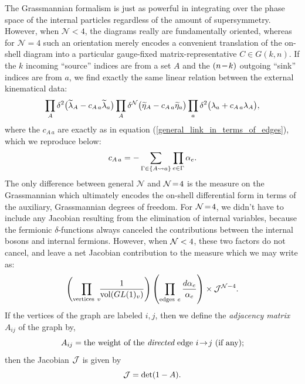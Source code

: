 \documentclass[12pt,hyperref,compress]{JHEP3}
\newcommand{\eq}[1]{\begin{equation}#1\end{equation}}
\newcommand{\mi}{{\rm\rule[2.4pt]{6pt}{0.65pt}}}
\begin{document}
The Grassmannian formalism is just as powerful in integrating over the phase space of the internal particles regardless of the amount of supersymmetry. However, when $\mathcal{N}<4$, the diagrams really are fundamentally oriented, whereas for $\mathcal{N}\!=\!4$ such an orientation merely encodes a convenient translation of the on-shell diagram into a particular gauge-fixed  matrix-representative $C\!\in\!G(k,n)$. If the $k$ incoming ``source'' indices are from a set  $A$ and the $(n\,\mi\,k)$ outgoing ``sink'' indices are from $a$, we find exactly the same linear relation between the external kinematical data:
\vspace{-.2cm}\eq{\prod_A\delta^2\big(\widetilde\lambda_A - c_{A\,a} \widetilde\lambda_a \big)\prod_A\delta^{\cal N} \big(\widetilde \eta_A-c_{A\,a} \widetilde \eta_a \big) \prod_a  \delta^2\big(\lambda_a + c_{A\,a}  \lambda_A \big),\vspace{-.2cm}}
where the $c_{A\,a}$ are exactly as in equation (\ref{general_link_in_terms_of_edges}), which we reproduce below:
\vspace{-.2cm}\eq{c_{A\,a}=-\sum_{\Gamma\in\{A\rightsquigarrow a\}}\prod_{e\in\Gamma}\alpha_e.\vspace{-.2cm}}
The only difference between general $\mathcal{N}$ and ${\cal N}\!=\!4$ is the measure on the Grassmannian which ultimately encodes the on-shell differential form in terms of the auxiliary, Grassmannian degrees of freedom. For ${\cal N}\!=\!4$, we didn't have to include any Jacobian resulting from the elimination of internal variables, because the fermionic $\delta$-functions always canceled the contributions between the internal bosons and internal fermions.  However, when ${\cal N}<4$, these two factors do not cancel, and leave a net Jacobian contribution to the measure which we may write as:
\vspace{-.2cm}\eq{\left(\prod_{\mathrm{vertices~}v}\!\!\frac{1}{\mathrm{vol}(GL(1)_v)}\right)\left(\prod_{\mathrm{edges~}e}\frac{d\alpha_e}{\alpha_e}\right) \times {\cal J}^{{\cal N} - 4}.\vspace{-.2cm}}
If the vertices of the graph are labeled $i,j$, then we define the {\it adjacency matrix} $A_{ij}$ of the graph by,
\vspace{-.3cm}\eq{A_{ij} = \text{the weight of the {\it directed} edge $i\!\to\!j$ (if any);}\vspace{-.3cm}}
then the Jacobian ${\cal J}$ is given by
\vspace{-.3cm}\eq{{\cal J} =\det(1-A).\vspace{-.3cm}}
\end{document}
